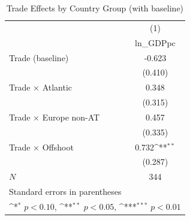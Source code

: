 \begin{table}[htbp]\centering
\def\sym#1{\ifmmode^{#1}\else\(^{#1}\)\fi}
\caption{Trade Effects by Country Group (with baseline)}
\begin{tabular}{l*{1}{c}}
\hline\hline
            &\multicolumn{1}{c}{(1)}\\
            &\multicolumn{1}{c}{ln\_GDPpc}\\
\hline
Trade (baseline)&      -0.623         \\
            &     (0.410)         \\
[1em]
Trade × Atlantic&       0.348         \\
            &     (0.315)         \\
[1em]
Trade × Europe non-AT&       0.457         \\
            &     (0.335)         \\
[1em]
Trade × Offshoot&       0.732\sym{**} \\
            &     (0.287)         \\
\hline
\(N\)       &         344         \\
\hline\hline
\multicolumn{2}{l}{\footnotesize Standard errors in parentheses}\\
\multicolumn{2}{l}{\footnotesize \sym{*} \(p<0.10\), \sym{**} \(p<0.05\), \sym{***} \(p<0.01\)}\\
\end{tabular}
\end{table}
